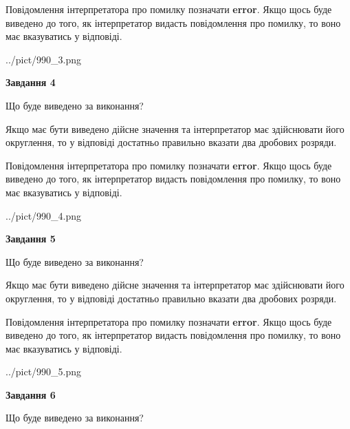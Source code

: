 \documentclass[12pt, ukrainian]{article}
\begin{document}
{\begin {Large}
Повідомлення інтерпретатора про помилку позначати \textbf{error}.
Якщо щось буде виведено до того, як інтерпретатор видасть повідомлення про помилку, 
то воно має вказуватись у відповіді. \par

\begin{center}
	{../pict/990_3.png}
\end{center}
\newpage

{\begin {center}\textbf{Завдання 4}\end {center}}\par
Що буде виведено за виконання? \par

Якщо має бути виведено дійсне значення та інтерпретатор має здійснювати його округлення, 
то у відповіді достатньо правильно вказати два дробових розряди.

Повідомлення інтерпретатора про помилку позначати \textbf{error}.
Якщо щось буде виведено до того, як інтерпретатор видасть повідомлення про помилку, 
то воно має вказуватись у відповіді. \par

\begin{center}
	{../pict/990_4.png}
\end{center}
\newpage

{\begin {center}\textbf{Завдання 5}\end {center}}\par
Що буде виведено за виконання? \par

Якщо має бути виведено дійсне значення та інтерпретатор має здійснювати його округлення, 
то у відповіді достатньо правильно вказати два дробових розряди.

Повідомлення інтерпретатора про помилку позначати \textbf{error}.
Якщо щось буде виведено до того, як інтерпретатор видасть повідомлення про помилку, 
то воно має вказуватись у відповіді. \par

\begin{center}
	{../pict/990_5.png}
\end{center}
\newpage

{\begin {center}\textbf{Завдання 6}\end {center}}\par
Що буде виведено за виконання? \par


\end{Large}}
\end{document}
